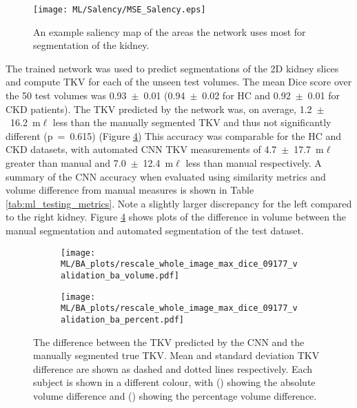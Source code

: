 \begin{figure}[H]
	\centering
	\texttt{[image: ML/Salency/MSE\_Salency.eps]}
	\caption{An example saliency map of the areas the network uses most for segmentation of the kidney.}
	\label{fig:ml_salency}	
\end{figure}

The trained network was used to predict segmentations of the 2D kidney slices and compute \ac{TKV} for each of the unseen test volumes. The mean Dice score over the 50 test volumes was 0.93~$\pm$~0.01 (0.94~$\pm$~0.02 for HC and 0.92~$\pm$~0.01 for \ac{CKD} patients). The \ac{TKV} predicted by the network was, on average, 1.2~$\pm$~16.2~m$\ell$ less than the manually segmented \ac{TKV} and thus not significantly different (p~=~0.615) (Figure \ref{fig:ml_testing_ba}) This accuracy was comparable for the \ac{HC} and \ac{CKD} datasets, with automated CNN \ac{TKV} measurements of 4.7~$\pm$~17.7~m$\ell$ greater than manual and 7.0~$\pm$~12.4~m$\ell$ less than manual respectively. A summary of the \ac{CNN} accuracy when evaluated using similarity metrics and volume difference from manual measures is shown in Table \ref{tab:ml_testing_metrics}. Note a slightly larger discrepancy for the left compared to the right kidney. Figure \ref{fig:ml_testing_ba} shows plots of the difference in volume between the manual segmentation and automated segmentation of the test dataset. 

\begin{figure}[H]
	\centering
	\begin{subfigure}[c]{0.47\textwidth}
		\centering
		\texttt{[image: ML/BA\_plots/rescale\_whole\_image\_max\_dice\_09177\_validation\_ba\_volume.pdf]}
		\caption{}
		\label{fig:ml_testing_ba_volume}
	\end{subfigure}
	\hfill
	\begin{subfigure}[c]{0.47\textwidth}
		\centering
		\texttt{[image: ML/BA\_plots/rescale\_whole\_image\_max\_dice\_09177\_validation\_ba\_percent.pdf]}
		\caption{}
		\label{fig:ml_testing_ba_percent}
	\end{subfigure}
	\caption{The difference between the \ac{TKV} predicted by the \ac{CNN} and the manually segmented true \ac{TKV}. Mean and standard deviation \ac{TKV} difference are shown as dashed and dotted lines respectively. Each subject is shown in a different colour, with () showing the absolute volume difference and () showing the percentage volume difference.}
	\label{fig:ml_testing_ba}
\end{figure}

